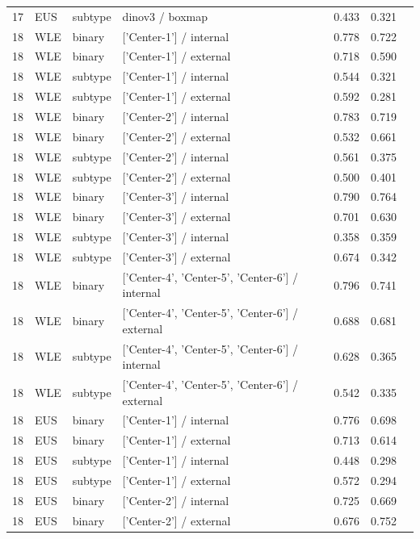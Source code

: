 \begin{longtable}{cL{1.1cm}L{1.5cm}L{5.6cm}ccc}
17 & EUS & subtype & dinov3 / boxmap & 0.433 & 0.321 & \nl{} \\
18 & WLE & binary & ['Center-1'] / internal & 0.778 & 0.722 & \nl{} \\
18 & WLE & binary & ['Center-1'] / external & 0.718 & 0.590 & \nl{} \\
18 & WLE & subtype & ['Center-1'] / internal & 0.544 & 0.321 & \nl{} \\
18 & WLE & subtype & ['Center-1'] / external & 0.592 & 0.281 & \nl{} \\
18 & WLE & binary & ['Center-2'] / internal & 0.783 & 0.719 & \nl{} \\
18 & WLE & binary & ['Center-2'] / external & 0.532 & 0.661 & \nl{} \\
18 & WLE & subtype & ['Center-2'] / internal & 0.561 & 0.375 & \nl{} \\
18 & WLE & subtype & ['Center-2'] / external & 0.500 & 0.401 & \nl{} \\
18 & WLE & binary & ['Center-3'] / internal & 0.790 & 0.764 & \nl{} \\
18 & WLE & binary & ['Center-3'] / external & 0.701 & 0.630 & \nl{} \\
18 & WLE & subtype & ['Center-3'] / internal & 0.358 & 0.359 & \nl{} \\
18 & WLE & subtype & ['Center-3'] / external & 0.674 & 0.342 & \nl{} \\
18 & WLE & binary & ['Center-4', 'Center-5', 'Center-6'] / internal & 0.796 & 0.741 & \nl{} \\
18 & WLE & binary & ['Center-4', 'Center-5', 'Center-6'] / external & 0.688 & 0.681 & \nl{} \\
18 & WLE & subtype & ['Center-4', 'Center-5', 'Center-6'] / internal & 0.628 & 0.365 & \nl{} \\
18 & WLE & subtype & ['Center-4', 'Center-5', 'Center-6'] / external & 0.542 & 0.335 & \nl{} \\
18 & EUS & binary & ['Center-1'] / internal & 0.776 & 0.698 & \nl{} \\
18 & EUS & binary & ['Center-1'] / external & 0.713 & 0.614 & \nl{} \\
18 & EUS & subtype & ['Center-1'] / internal & 0.448 & 0.298 & \nl{} \\
18 & EUS & subtype & ['Center-1'] / external & 0.572 & 0.294 & \nl{} \\
18 & EUS & binary & ['Center-2'] / internal & 0.725 & 0.669 & \nl{} \\
18 & EUS & binary & ['Center-2'] / external & 0.676 & 0.752 & \nl{} \\

\end{longtable}

